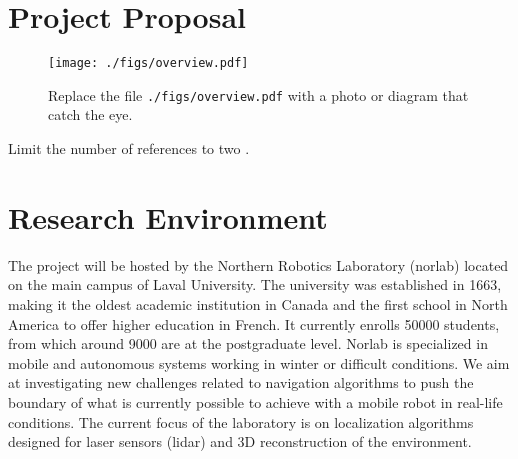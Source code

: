 \documentclass[10pt,letterpaper,oneside]{article}
\author{Fran\c{c}ois Pomerleau \\
       Laval University\\
       1065, av. de la Médecine \\
       Quebec, Qc \\
       Canada G1V 0A6 \\
       \texttt{<francois.pomerleau@ift.ulaval.ca>}
}
\begin{document}
\makeCustomTitle

\section*{Project Proposal}

\begin{wrapfigure}{R}{0.35\textwidth}
\centering
\texttt{[image: ./figs/overview.pdf]}
\caption{
Replace the file \texttt{./figs/overview.pdf} with a photo or diagram that catch the eye.
}
\label{fig:overview}
\end{wrapfigure}

Limit the number of references to two \cite{Pomerleau2013,Pomerleau2014}.
\lipsum[1-2]

\section*{Research Environment}

The project will be hosted by the Northern Robotics Laboratory (norlab) located on the main campus of Laval University.
The university was established in \num{1663}, making it the oldest academic institution in Canada and the first school in North America to offer higher education in French.
It currently enrolls \num{50000} students, from which around \num{9000} are at the postgraduate level.
Norlab is specialized in mobile and autonomous systems working in winter or difficult conditions. 
We aim at investigating new challenges related to navigation algorithms to push the boundary of what is currently possible to achieve with a mobile robot in real-life conditions. 
The current focus of the laboratory is on localization algorithms designed for laser sensors (lidar) and 3D reconstruction of the environment.

\printbibliography
\end{document}

